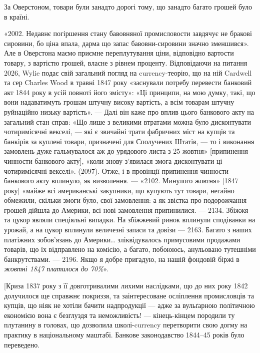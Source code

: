 За Оверстоном, товари були занадто дорогі тому, що занадто багато грошей
було в країні.

«2002. Недавнє погіршення стану бавовняної промисловости завдячує не
бракові сировини, бо ціна впала, дарма що запас бавовни-сировини значно
зменшився». Але в Оверстона маємо приємне переплутування ціни, відповідно
вартости товару, з вартістю грошей, власне з рівнем проценту. Відповідаючи на
питання 2026, Wylie подає свій загальний погляд на currency-теорію, що на
ній Cardwell та сер Charles Wood в травні 1847 року «заснували потребу перевести
банковий акт 1844 року в усій повноті його змісту»: «Ці принципи, на
мою думку, такі, що вони надаватимуть грошам штучну високу вартість, а всім
товарам штучну руйнаційно низьку вартість». — Далі він каже про вплив цього
банкового акту на загальний стан справ: «Що лише з великими втратами можна
було дисконтувати чотиримісячні векселі, — які є звичайні трати фабричних міст
на купців та банкірів за куплені товари, призначені для Сполучених Штатів, —
то і виконання замовлень дуже гальмувалося аж до урядового листа з 25 жовтня»
[припинення чинности банкового акту], «коли знову з’явилася змога дисконтувати
ці чотиримісячні векселі». (2097). Отже, і в провінції припинення чинности
банкового акту вплинуло, як визволення. — «2102. Минулого жовтня»
[1847 року] «майже всі американські закупники, що купують тут товари, негайно
обмежили, скільки змоги було, свої замовлення: а як звістка про подорожчання
грошей дійшла до Америки, всі нові замовлення припинилися. — 2134.
Збіжжя та цукор являли спеціяльні випадки. На збіжжевий ринок вплинули
сподіванки на урожай, а на цукор вплинули величезні запаси та довізи — 2163.
Багато з наших платіжних зобов’язань до Америки\dots{} зліквідувалось примусовими
продажами товарів, що їх відправлено на комісію, а багато, побоююсь,
анульовано тутешніми банкрутствами. — 2196. Якщо я добре пригадую, на нашій
фондовій біржі в \emph{жовтні 1847 платилося до 70\%}».

[Криза 1837 року з її довготривалими лихими наслідками, що до них
року 1842 долучилося ще справжнє покриззя, та заінтересоване осліплення
промисловців та купців, що ніяк не хотіли бачити надпродукції — адже за
вульґарною політичною економією вона є безглуздя та неможливість! — кінець-кінцем
породили ту плутанину в головах, що дозволила школі-currency перетворити
свою догму на практику в національному маштабі. Банкове законодавство
1844--45 років було переведено.

